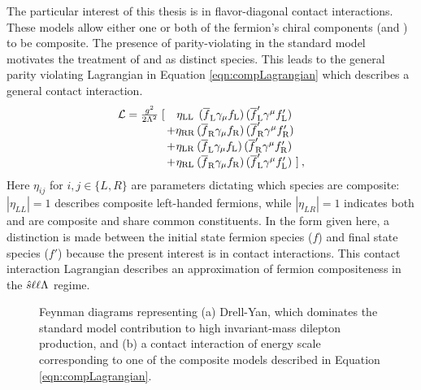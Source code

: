 The particular interest of this thesis is in flavor-diagonal contact interactions.
These models allow either one or both of the fermion's chiral components (\fl and \fr) to be composite.
The presence of parity-violating in the standard model motivates the treatment of \fl and \fr as distinct species.
This leads to the general parity violating Lagrangian in Equation \ref{eqn:compLagrangian} which describes a general contact interaction.
\begin{equation}\label{eqn:compLagrangian}
\begin{array}{r@{\,}c@{}c@{\,}l@{\,}l}
\mathcal L = \frac{g^2}{2\Lambda^2}\;[ && \eta_{\mathrm{LL}}&\, (\ufl\gamma_{\mu} \fl)\,(\uflp\gamma^{\mu}\flp) \nonumber \\
& +&\eta_{\mathrm{RR}}& (\ufr\gamma_{\mu} \fr) \,(\ufrp\gamma^{\mu}\frp) \\
&+&\eta_{\mathrm{LR}}& (\ufl\gamma_{\mu} \fl) \,(\ufrp\gamma^{\mu}\frp) \\
&+&\eta_{\mathrm{RL}}& (\ufr\gamma_{\mu} \fr) \,(\uflp\gamma^{\mu}\flp)& ] \: ,\nonumber
\end{array}
\end{equation}
Here $\eta_{ij}$ for $i,j\in\{L,R\}$ are parameters dictating which species are composite: $|\eta_{LL}|=1$ describes composite left-handed fermions, while $|\eta_{LR}|=1$ indicates both \fr and \fl are composite and share common constituents.
In the form given here, a distinction is made between the initial state fermion species ($f$) and final state species ($f'$) because the present interest is in \llqq contact interactions.
This contact interaction Lagrangian describes an approximation of fermion compositeness in the $\shat\llt\lam$ regime.

\begin{figure}[h!]
\captionsetup[subfigure]{position=b}
\centering
{}
\caption{Feynman diagrams representing (a) Drell-Yan, which dominates the standard model contribution to high invariant-mass dilepton production, and (b) a contact interaction of energy scale \lam corresponding to one of the composite models described in Equation \ref{eqn:compLagrangian}.}
\label{fig:ciPheno}
\end{figure}

